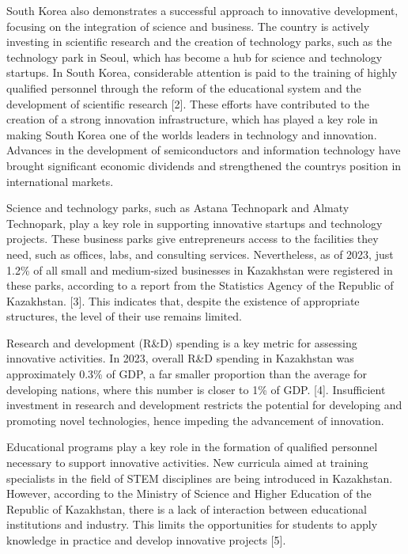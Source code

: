 South Korea also demonstrates a successful approach to innovative
development, focusing on the integration of science and business. The
country is actively investing in scientific research and the creation of
technology parks, such as the technology park in Seoul, which has become
a hub for science and technology startups. In South Korea, considerable
attention is paid to the training of highly qualified personnel through
the reform of the educational system and the development of scientific
research {[}2{]}. These efforts have contributed to the creation of a
strong innovation infrastructure, which has played a key role in making
South Korea one of the world\textquotesingle s leaders in technology and
innovation. Advances in the development of semiconductors and
information technology have brought significant economic dividends and
strengthened the country\textquotesingle s position in international
markets.

Science and technology parks, such as Astana Technopark and Almaty
Technopark, play a key role in supporting innovative startups and
technology projects. These business parks give entrepreneurs access to
the facilities they need, such as offices, labs, and consulting
services. Nevertheless, as of 2023, just 1.2\% of all small and
medium-sized businesses in Kazakhstan were registered in these parks,
according to a report from the Statistics Agency of the Republic of
Kazakhstan. {[}3{]}. This indicates that, despite the existence of
appropriate structures, the level of their use remains limited.

Research and development (R\&D) spending is a key metric for assessing
innovative activities. In 2023, overall R\&D spending in Kazakhstan was
approximately 0.3\% of GDP, a far smaller proportion than the average
for developing nations, where this number is closer to 1\% of GDP.
{[}4{]}. Insufficient investment in research and development restricts
the potential for developing and promoting novel technologies, hence
impeding the advancement of innovation.

Educational programs play a key role in the formation of qualified
personnel necessary to support innovative activities. New curricula
aimed at training specialists in the field of STEM disciplines are being
introduced in Kazakhstan. However, according to the Ministry of Science
and Higher Education of the Republic of Kazakhstan, there is a lack of
interaction between educational institutions and industry. This limits
the opportunities for students to apply knowledge in practice and
develop innovative projects {[}5{]}.

